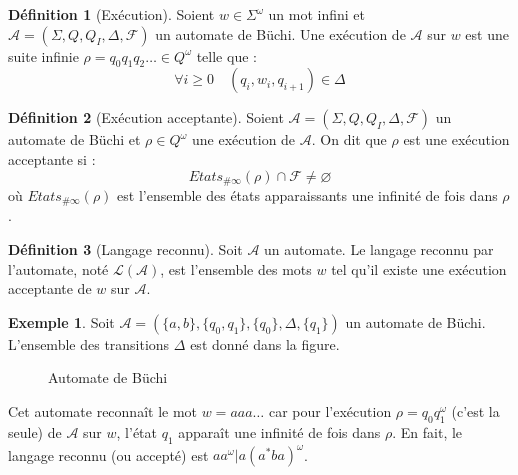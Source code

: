 \documentclass[12pt,a4paper]{article}
\theoremstyle{plain}
\theoremstyle{definition}
\newtheorem{defi}{Définition}
\newtheorem{ex}{Exemple}
\begin{document}
\begin{defi}[Exécution]
  Soient $w \in \Sigma^\omega$ un mot infini et $\mathcal{A}=(\Sigma, Q, Q_I, \Delta, \mathscr{F})$ un automate de Büchi.
  Une exécution de $\mathcal{A}$ sur $w$ est une suite infinie $\rho = q_0q_1q_2\dots \in Q^\omega$ telle que :
  \[
    \forall i \geq 0 \quad (q_i, w_i, q_{i+1}) \in \Delta
  \]
\end{defi}

\begin{defi}[Exécution acceptante]
  \label{exec-accept}
  Soient $\mathcal{A}=(\Sigma, Q, Q_I, \Delta, \mathscr{F})$ un automate de Büchi et $\rho \in Q^\omega$ une exécution de $\mathcal{A}$.
  On dit que $\rho$ est une exécution acceptante si :
  \[
    Etats_{\#\infty}(\rho) \cap \mathscr{F} \neq \varnothing
  \]
  où $Etats_{\#\infty}(\rho)$ est l'ensemble des états apparaissants une infinité de fois dans $\rho$.
\end{defi}

\begin{defi}[Langage reconnu]
  Soit $\mathcal{A}$ un automate.
  Le langage reconnu par l'automate, noté $\mathcal{L}(\mathcal{A})$, est l'ensemble des mots $w$ tel qu'il existe une exécution acceptante de $w$ sur $\mathcal{A}$.
\end{defi}

\begin{ex}
  Soit $\mathcal{A}=(\{a,b\}, \{q_0, q_1\}, \{q_0\}, \Delta, \{q_1\})$ un automate de Büchi.
  L'ensemble des transitions $\Delta$ est donné dans la figure.
  \begin{figure}[h]
    \centering
    \caption{Automate de Büchi}
  \end{figure}
  
  Cet automate reconnaît le mot $w = aaa\dots$ car pour l'exécution $\rho = q_0q_1^\omega$ (c'est la seule) de $\mathcal{A}$ sur $w$, l'état $q_1$ apparaît une infinité de fois dans $\rho$.
  En fait, le langage reconnu (ou accepté) est $aa^\omega | a(a^*ba)^\omega$.
\end{ex}
\end{document}
